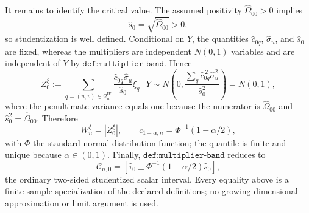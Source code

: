 It remains to identify the critical value.  The assumed positivity
\(\widehat\Omega_{00}>0\) implies
\[
\widehat s_0=\sqrt{\widehat\Omega_{00}}>0,
\]
so studentization is well defined.  Conditional on \(Y\), the quantities
\(\widehat c_{0q}\), \(\widehat\sigma_u\), and \(\widehat s_0\) are fixed,
whereas the multipliers are independent \(N(0,1)\) variables and are
independent of \(Y\) by \(\texttt{def:multiplier-band}\).  Hence
\[
Z_0^\xi
:=\sum_{q=(u,v)\in\mathcal Q_n^{\mathrm{IF}}}
  \frac{\widehat c_{0q}\widehat\sigma_u}{\widehat s_0}\xi_q
\ \bigg|\ Y
\sim N\!\left(
0,
\frac{\sum_q\widehat c_{0q}^{\,2}\widehat\sigma_u^2}
     {\widehat s_0^2}
\right)
=N(0,1),
\]
where the penultimate variance equals one because the numerator is
\(\widehat\Omega_{00}\) and
\(\widehat s_0^2=\widehat\Omega_{00}\).  Therefore
\[
W_n^\xi=|Z_0^\xi|,
\qquad
c_{1-\alpha,n}=\Phi^{-1}(1-\alpha/2),
\]
with \(\Phi\) the standard-normal distribution function; the quantile is
finite and unique because \(\alpha\in(0,1)\).  Finally,
\(\texttt{def:multiplier-band}\) reduces to
\[
\mathcal C_{n,0}
=\left[
\widehat\tau_0
\pm \Phi^{-1}(1-\alpha/2)\widehat s_0
\right],
\]
the ordinary two-sided studentized scalar interval.  Every equality above is
a finite-sample specialization of the declared definitions; no
growing-dimensional approximation or limit argument is used.
